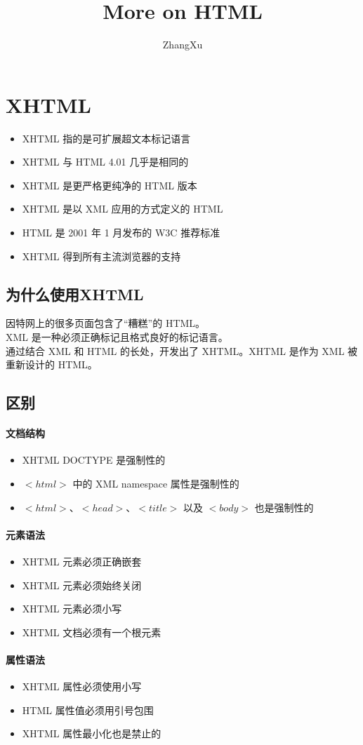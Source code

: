 \documentclass[10pt,UTF8]{ctexart}
\title{More on HTML}
\author{ZhangXu}
\begin{document}
\maketitle
{}

\section{XHTML}
\begin{itemize}
\item XHTML 指的是可扩展超文本标记语言
\item XHTML 与 HTML 4.01 几乎是相同的
\item XHTML 是更严格更纯净的 HTML 版本
\item XHTML 是以 XML 应用的方式定义的 HTML
\item HTML 是 2001 年 1 月发布的 W3C 推荐标准
\item XHTML 得到所有主流浏览器的支持
\end{itemize}
\subsection{为什么使用XHTML}
因特网上的很多页面包含了“糟糕”的 HTML。\\
XML 是一种必须正确标记且格式良好的标记语言。\\
通过结合 XML 和 HTML 的长处，开发出了 XHTML。XHTML 是作为 XML 被重新设计的 HTML。
\subsection{区别}
\paragraph{文档结构}
\begin{itemize}
\item XHTML DOCTYPE 是强制性的
\item $<html>$ 中的 XML namespace 属性是强制性的
\item $<html>$、$<head>$、$<title>$ 以及 $<body>$ 也是强制性的
\end{itemize}
\paragraph{元素语法}
\begin{itemize}
\item XHTML 元素必须正确嵌套
\item XHTML 元素必须始终关闭
\item XHTML 元素必须小写
\item XHTML 文档必须有一个根元素
\end{itemize}

\paragraph{属性语法}
\begin{itemize}
\item XHTML 属性必须使用小写
\item HTML 属性值必须用引号包围
\item XHTML 属性最小化也是禁止的
\end{itemize}
\end{document}
